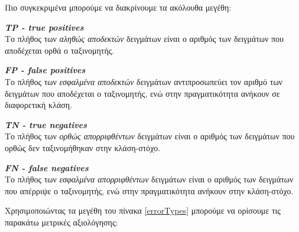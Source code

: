 Πιο συγκεκριμένα μπορούμε να διακρίνουμε τα ακόλουθα μεγέθη:
\\
\begin{description}
\item\textit{\textbf{TP - true positives}}
\\
Το πλήθος των \textit{αληθώς αποδεκτών} δειγμάτων είναι ο αριθμός των δειγμάτων που αποδέχεται ορθά ο ταξινομητής.
\\

\item\textit{\textbf{FP - false positives}} 
\\
Το πλήθος των \textit{εσφαλμένα αποδεκτών} δειγμάτων αντιπροσωπεύει τον αριθμό των δειγμάτων που αποδέχεται ο ταξινομητής, ενώ στην πραγματικότητα ανήκουν σε διαφορετική κλάση.
\\

\item\textit{\textbf{TN - true negatives}} 
\\
Το πλήθος των \textit{ορθώς απορριφθέντων} δειγμάτων είναι ο αριθμός των δειγμάτων που ορθώς δεν ταξινομήθηκαν στην κλάση-στόχο.
\\

\item\textit{\textbf{FN - false negatives}} 
\\
Το πλήθος των \textit{εσφαλμένα απορριφθέντων} δειγμάτων είναι ο αριθμός των δειγμάτων που απέρριψε ο ταξινομητής, ενώ στην πραγματικότητα ανήκουν στην κλάση-στόχο.
\\
\end{description}
Χρησιμοποιώντας τα μεγέθη του πίνακα \ref{errorTypes} μπορούμε να ορίσουμε τις παρακάτω μετρικές αξιολόγησης:
\\

